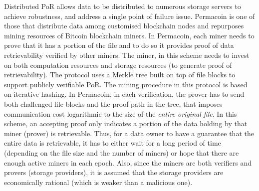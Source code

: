 
Distributed  PoR allows  data to be distributed to numerous storage servers to achieve robustness, and address a single point of failure issue. Permacoin \cite{MillerPermacoin} is one of those  that distribute data among  customised blockchain nodes and  repurposes  mining resources of Bitcoin blockchain miners. In Permacoin, each miner needs to prove that it has a portion of the file and to do so it provides  proof of data retrievability verified by other miners. The miner, in this scheme needs to invest on both computation resources  and storage resources (to generate proof of retrievability). The protocol uses a Merkle tree built on top of file blocks to support publicly verifiable PoR. The mining procedure in this protocol is based on iterative hashing. In Permacoin, in each verification, the prover has to send both challenged file blocks and  the proof path in the tree, that imposes communication cost logarithmic to the size of the \emph{entire original file}.  In this scheme, an accepting proof only indicates a portion of the data holding by that miner (prover) is retrievable. Thus, for a data owner to have a guarantee that the entire data is retrievable, it  has to either wait for a long period of time (depending on the file size and the number of miners) or hope that there are enough active miners in each epoch.  Also, since the miners are both verifiers and provers (storage providers), it is assumed that the storage providers are economically rational (which is weaker than a malicious one). %





